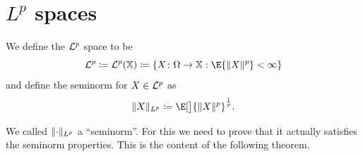 



\section[\texorpdfstring{\(L^p\)}{Lp} spaces]{\texorpdfstring{\(L^p\)}{Lp} spaces  }
\label{sec: Lp spaces}

\begin{definition}
    We define the \(\mathcal{L}^p\) space to be
    \[
        \cL^p \coloneq \cL^p(\domain) \coloneq \set{X\colon \Omega \to \domain : \E{\norm{X}^p} < \infty}
    \]
    and define the seminorm for \(X\in \mathcal{L}^p\) as
    \[
        \norm{X}_{L^p} \coloneq \E[\big]{\norm{X}^p}^{\frac1p}.
    \]
\end{definition}

We called \(\lVert\cdot\rVert_{L^p}\) a ``seminorm''. For this we need to prove that
it actually satisfies the seminorm properties. This is the content of the
following theorem.

